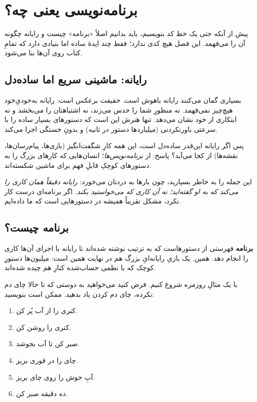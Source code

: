 \chapter{برنامه‌نویسی یعنی چه؟}%
\label{ch:what-is-programming}

پیش از آنکه حتی یک خط کد بنویسیم، باید بدانیم اصلاً «برنامه» چیست و رایانه
چگونه آن را می‌فهمد. این فصل هیچ کدی ندارد؛ فقط چند ایدهٔ ساده اما بنیادی
دارد که تمامِ کتاب روی آن‌ها بنا می‌شود.

\section{رایانه: ماشینی سریع اما ساده‌دل}

بسیاری گمان می‌کنند رایانه باهوش است. حقیقت برعکس است: رایانه به‌خودیِ‌خود
هیچ‌چیز نمی‌فهمد. نه منظورِ شما را حدس می‌زند، نه اشتباهتان را می‌بخشد و نه
ابتکاری از خود نشان می‌دهد. تنها هنرش این است که دستورهای بسیار ساده را با
سرعتی باورنکردنی (میلیاردها دستور در ثانیه) و بدونِ خستگی اجرا می‌کند.

پس اگر رایانه این‌قدر ساده‌دل است، این همه کارِ شگفت‌انگیز (بازی‌ها،
پیام‌رسان‌ها، نقشه‌ها) از کجا می‌آید؟ پاسخ: از \emph{برنامه‌نویس‌ها}؛
انسان‌هایی که کارهای بزرگ را به دستورهای کوچکِ قابلِ فهم برای ماشین
شکسته‌اند.

\begin{note}
این جمله را به خاطر بسپارید، چون بارها به دردتان می‌خورد: \emph{رایانه دقیقاً
همان کاری را می‌کند که به او گفته‌اید؛ نه آن کاری که می‌خواستید بکند.} اگر
برنامه‌ای درست کار نکرد، مشکل تقریباً همیشه در دستورهایی است که ما داده‌ایم.
\end{note}

\section{برنامه چیست؟}

\textbf{برنامه} فهرستی از دستورهاست که به ترتیب نوشته شده‌اند تا رایانه با
اجرای آن‌ها کاری را انجام دهد. همین. یک بازیِ رایانه‌ایِ بزرگ هم در نهایت
همین است: میلیون‌ها دستورِ کوچک که با نظمی حساب‌شده کنارِ هم چیده شده‌اند.

با یک مثالِ روزمره شروع کنیم. فرض کنید می‌خواهید به دوستی که تا حالا چای دم
نکرده، چای دم کردن یاد بدهید. ممکن است بنویسید:

\begin{enumerate}
  \item کتری را از آب پُر کن.
  \item کتری را روشن کن.
  \item صبر کن تا آب بجوشد.
  \item چای را در قوری بریز.
  \item آبِ جوش را روی چای بریز.
  \item ده دقیقه صبر کن.
\end{enumerate}

